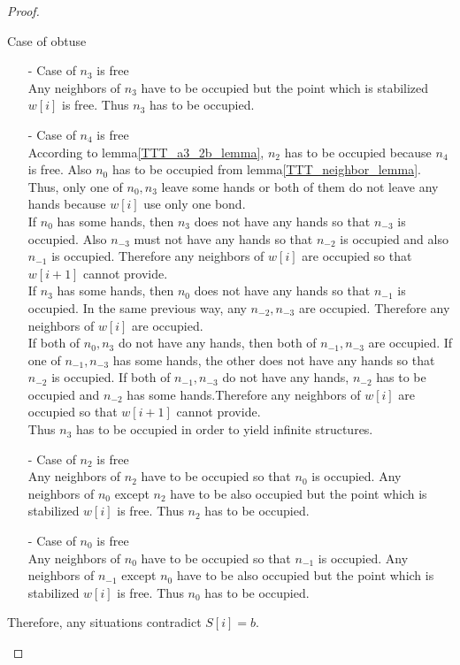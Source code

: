 \begin{proof}
\begin{paragraph}{Case of obtuse}
\begin{itemize}
\item[-] Case of $n_3$ is free\\
Any neighbors of $n_3$ have to be occupied but the point which is stabilized $w[i]$ is free. Thus $n_3$ has to be occupied.
\item[-] Case of $n_4$ is free\\
According to lemma\ref{TTT_a3_2b_lemma}, $n_2$ has to be occupied because $n_4$ is free. Also $n_0$ has to be occupied from lemma\ref{TTT_neighbor_lemma}. Thus, only one of $n_0, n_3$ leave some hands or both of them do not leave any hands because $w[i]$ use only one bond.\\
If $n_0$ has some hands, then $n_3$ does not have any hands so that $n_{-3}$ is occupied. Also $n_{-3}$ must not have any hands so that $n_{-2}$ is occupied and also $n_{-1}$ is occupied. Therefore any neighbors of $w[i]$ are occupied so that $w[i+1]$ cannot provide.\\
If $n_3$ has some hands, then $n_0$ does not have any hands so that $n_{-1}$ is occupied. In the same previous way, any $n_{-2}, n_{-3}$ are occupied.  Therefore any neighbors of $w[i]$ are occupied.\\
If both of $n_0, n_3$ do not have any hands, then both of $n_{-1}, n_{-3}$ are occupied. If one of $n_{-1}, n_{-3}$ has some hands, the other does not have any hands so that $n_{-2}$ is occupied. If both of $n_{-1}, n_{-3}$ do not have any hands, $n_{-2}$ has to be occupied and $n_{-2}$ has some hands.Therefore any neighbors of $w[i]$ are occupied so that $w[i+1]$ cannot provide.\\
Thus $n_3$ has to be occupied in order to yield infinite structures.
\item[-] Case of $n_2$ is free\\
Any neighbors of $n_2$ have to be occupied so that $n_0$ is occupied. Any neighbors of $n_0$ except $n_2$ have to be also occupied but the point which is stabilized $w[i]$ is free. Thus $n_2$ has to be occupied.
\item[-] Case of $n_0$ is free\\
Any neighbors of $n_0$ have to be occupied so that $n_{-1}$ is occupied. Any neighbors of $n_{-1}$ except $n_0$ have to be also occupied but the point which is stabilized $w[i]$ is free. Thus $n_0$ has to be occupied. 
\end{itemize}

Therefore, any situations contradict $S[i] = b$.


\end{paragraph}
\end{proof}
